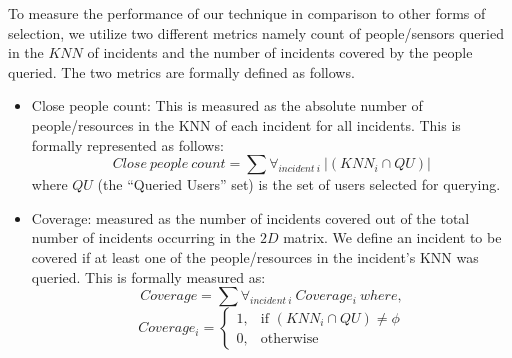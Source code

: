 \documentclass{acm_proc_article-sp}
\begin{document}
 To measure the performance of our technique in comparison to other forms of selection, we utilize two different metrics namely count of people/sensors queried in the $KNN$ of incidents and the number of incidents covered by the people queried. The two metrics are formally defined as follows.
 \begin{itemize}
 \item Close people count: This is measured as the absolute number of people/resources in the KNN of each incident for all incidents. This is formally represented as follows:
 \begin{equation}
 Close\ people\ count = \sum \forall_{incident\ i}\ |(KNN_i \cap {QU})|
 \end{equation}
 where $QU$ (the ``Queried Users'' set) is the set of users selected for querying. 
 \item Coverage: measured as the number of incidents covered out of the total number of incidents occurring in the $2D$ matrix. We define an incident to be covered if at least one of the people/resources in the incident's KNN was queried. This is formally measured as:
 \begin{equation}
Coverage = \sum \forall_{incident\ i}\ Coverage_i\  where,
 \end{equation}
 \[
    Coverage_i = 
\begin{cases}
    1,& \text{if }(KNN_i \cap {QU}) \neq \phi\\
    0,              & \text{otherwise}
\end{cases}
\]
\end{itemize}  
\end{document}
